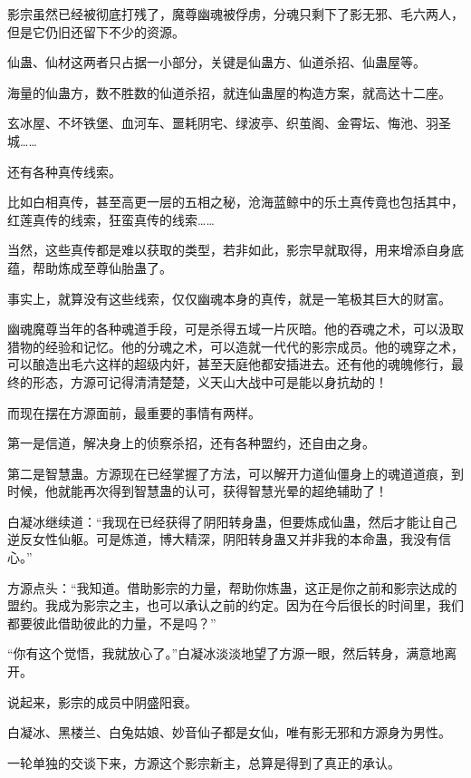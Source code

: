 
\begin{this_body}

影宗虽然已经被彻底打残了，魔尊幽魂被俘虏，分魂只剩下了影无邪、毛六两人，但是它仍旧还留下不少的资源。

仙蛊、仙材这两者只占据一小部分，关键是仙蛊方、仙道杀招、仙蛊屋等。

海量的仙蛊方，数不胜数的仙道杀招，就连仙蛊屋的构造方案，就高达十二座。

玄冰屋、不坏铁堡、血河车、噩耗阴宅、绿波亭、织茧阁、金霄坛、悔池、羽圣城……

还有各种真传线索。

比如白相真传，甚至高更一层的五相之秘，沧海蓝鲸中的乐土真传竟也包括其中，红莲真传的线索，狂蛮真传的线索……

当然，这些真传都是难以获取的类型，若非如此，影宗早就取得，用来增添自身底蕴，帮助炼成至尊仙胎蛊了。

事实上，就算没有这些线索，仅仅幽魂本身的真传，就是一笔极其巨大的财富。

幽魂魔尊当年的各种魂道手段，可是杀得五域一片灰暗。他的吞魂之术，可以汲取猎物的经验和记忆。他的分魂之术，可以造就一代代的影宗成员。他的魂穿之术，可以酿造出毛六这样的超级内奸，甚至天庭他都安插进去。还有他的魂魄修行，最终的形态，方源可记得清清楚楚，义天山大战中可是能以身抗劫的！

而现在摆在方源面前，最重要的事情有两样。

第一是信道，解决身上的侦察杀招，还有各种盟约，还自由之身。

第二是智慧蛊。方源现在已经掌握了方法，可以解开力道仙僵身上的魂道道痕，到时候，他就能再次得到智慧蛊的认可，获得智慧光晕的超绝辅助了！

白凝冰继续道：“我现在已经获得了阴阳转身蛊，但要炼成仙蛊，然后才能让自己逆反女性仙躯。可是炼道，博大精深，阴阳转身蛊又并非我的本命蛊，我没有信心。”

方源点头：“我知道。借助影宗的力量，帮助你炼蛊，这正是你之前和影宗达成的盟约。我成为影宗之主，也可以承认之前的约定。因为在今后很长的时间里，我们都要彼此借助彼此的力量，不是吗？”

“你有这个觉悟，我就放心了。”白凝冰淡淡地望了方源一眼，然后转身，满意地离开。

说起来，影宗的成员中阴盛阳衰。

白凝冰、黑楼兰、白兔姑娘、妙音仙子都是女仙，唯有影无邪和方源身为男性。

一轮单独的交谈下来，方源这个影宗新主，总算是得到了真正的承认。


\end{this_body}

